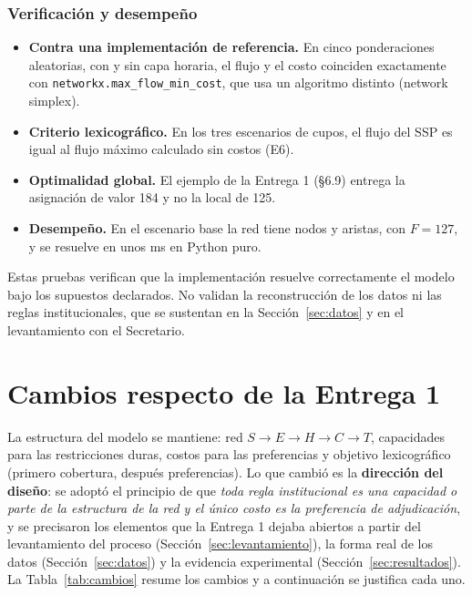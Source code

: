 \documentclass{article}
\begin{document}
\subsubsection{Verificación y desempeño}

\begin{itemize}
    \item \textbf{Contra una implementación de referencia.} En cinco ponderaciones aleatorias, con y sin capa horaria, el flujo y el costo coinciden exactamente con \texttt{networkx.max\_flow\_min\_cost}, que usa un algoritmo distinto (network simplex).
    \item \textbf{Criterio lexicográfico.} En los tres escenarios de cupos, el flujo del SSP es igual al flujo máximo calculado sin costos (E6).
    \item \textbf{Optimalidad global.} El ejemplo de la Entrega 1 (§6.9) entrega la asignación de valor 184 y no la local de 125.
    \item \textbf{Desempeño.} En el escenario base la red tiene \redNodos{} nodos y \redAristas{} aristas, con $F = 127$, y se resuelve en unos \redMs{} ms en Python puro.
\end{itemize}
Estas pruebas verifican que la implementación resuelve correctamente el modelo bajo los supuestos declarados. No validan la reconstrucción de los datos ni las reglas institucionales, que se sustentan en la Sección~\ref{sec:datos} y en el levantamiento con el Secretario.

\section{Cambios respecto de la Entrega 1}
\label{sec:cambios}

La estructura del modelo se mantiene: red $S \to E \to H \to C \to T$, capacidades para las restricciones duras, costos para las preferencias y objetivo lexicográfico (primero cobertura, después preferencias). Lo que cambió es la \textbf{dirección del diseño}: se adoptó el principio de que \emph{toda regla institucional es una capacidad o parte de la estructura de la red y el único costo es la preferencia de adjudicación}, y se precisaron los elementos que la Entrega 1 dejaba abiertos a partir del levantamiento del proceso (Sección~\ref{sec:levantamiento}), la forma real de los datos (Sección~\ref{sec:datos}) y la evidencia experimental (Sección~\ref{sec:resultados}). La Tabla~\ref{tab:cambios} resume los cambios y a continuación se justifica cada uno.
\end{document}
